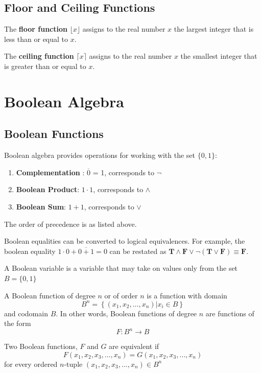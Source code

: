 \subsection{Floor and Ceiling Functions}
The \textbf{floor function} \(\lfloor x \rfloor \)  assigns to the real number \( x \) the largest integer that is less than or equal to \( x \).

The \textbf{ceiling function} \(\lceil x \rceil \)  assigns to the real number \( x \) the smallest integer that is greater than or equal to \( x \).


\section{Boolean Algebra}

\subsection{Boolean Functions}
Boolean algebra provides operations for working with the set \( \{0,1\} \):
\begin{enumerate}
	\item \textbf{Complementation} : \( \overline{0}  \) = 1, corresponds to \( \neg \) 
	\item \textbf{Boolean Product}: \( 1 \cdot 1 \), corresponds to \( \wedge \)   
	\item \textbf{Boolean Sum}: \( 1 + 1 \), corresponds to \( \vee \) 
\end{enumerate}
The order of precedence is as listed above.

Boolean equalities can be converted to logical equivalences. For example, the boolean equality \( 1 \cdot 0 + \overline{0 + 1} = 0 \) can be restated as \( \mathbf{T} \wedge \mathbf{F} \vee \neg( \mathbf{T}	\vee \mathbf{F})\equiv \mathbf{F}\).

A Boolean variable is a variable that may take on values only from the set\( B=\{0,1\} \) 

A Boolean function of degree \(n\) or of order \(n\) is a function with domain \[B^{n}=\left\{\left(x_{1}, x_{2}, \ldots, x_{n}\right) | x_{i} \in B\right\}\] and codomain \(B .\) In other words, Boolean functions of degree \(n\) are functions of the form \[F: B^{n} \rightarrow B\]

Two Boolean functions, \(F\) and \(G\) are equivalent if
	\[
	F\left(x_{1}, x_{2}, x_{3}, \ldots, x_{n}\right)=G\left(x_{1}, x_{2}, x_{3}, \ldots, x_{n}\right)
	\]
	for every ordered \(n\)-tuple \(\left(x_{1}, x_{2}, x_{3}, \ldots, x_{n}\right) \in B^{n}\)

